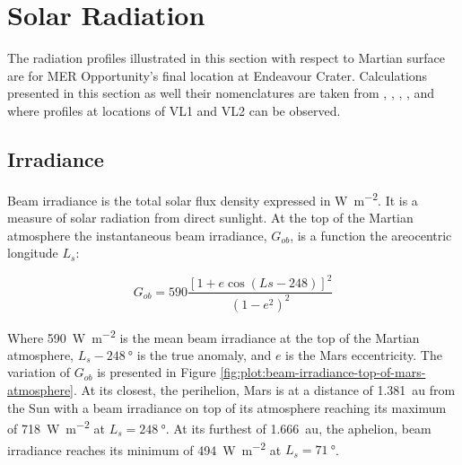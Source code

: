 \section{Solar Radiation}
\label{sec:MartianEnvironment:SolarRadiation}


The radiation profiles illustrated in this section with respect to Martian surface are for MER Opportunity's final location at Endeavour Crater. Calculations presented in this section as well their nomenclatures are taken from , , , , and  where profiles at locations of \ac{VL1} and \ac{VL2} can be observed.

\subsection{Irradiance}
\label{sec:MartianEnvironment:SolarRadiation:Irradiance}

Beam irradiance is the total solar flux density expressed in \si{\watt\per\meter\squared}. It is a measure of solar radiation from direct sunlight. At the top of the Martian atmosphere the instantaneous beam irradiance, $G_{ob}$, is a function the areocentric longitude $L_{s}$:

\begin{equation}
  \label{eq:G_ob}
  G_{ob} = 590 \frac{[1 + e \cos{(Ls - 248)}]^2}{(1-e^2)^2}
\end{equation}

Where \SI{590}{\watt\per\meter\squared} is the mean beam irradiance at the top of the Martian atmosphere, $L_{s} - \SI{248}{\degree}$ is the true anomaly, and $e$ is the Mars eccentricity. The variation of $G_{ob}$ is presented in Figure \ref{fig:plot:beam-irradiance-top-of-mars-atmosphere}. At its closest, the perihelion, Mars is at a distance of \SI{1.381}{\astronomicalunit} from the Sun with a beam irradiance on top of its atmosphere reaching its maximum of \SI{718}{\watt\per\meter\squared} at $L_{s} = \SI{248}{\degree}$. At its furthest of \SI{1.666}{\astronomicalunit}, the aphelion, beam irradiance reaches its minimum of \SI{494}{\watt\per\meter\squared} at $L_{s} = \SI{71}{\degree}$.

